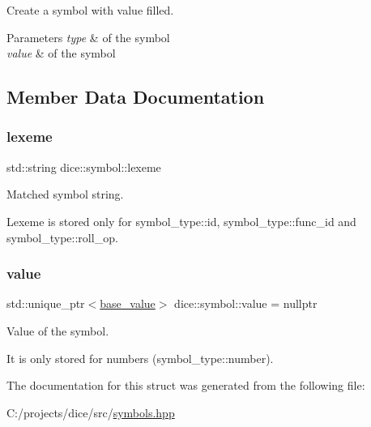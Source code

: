 Create a symbol with value filled. 


\begin{DoxyParams}{Parameters}
{\em type} & of the symbol \\
\hline
{\em value} & of the symbol \\
\hline
\end{DoxyParams}


\subsection{Member Data Documentation}
\mbox{\label{structdice_1_1symbol_abef11b61a11ced6140a6e1626bce0350}} 
\subsubsection{\texorpdfstring{lexeme}{lexeme}}
{\footnotesize\ttfamily std\+::string dice\+::symbol\+::lexeme}



Matched symbol string. 

Lexeme is stored only for symbol\+\_\+type\+::id, symbol\+\_\+type\+::func\+\_\+id and symbol\+\_\+type\+::roll\+\_\+op. \mbox{\label{structdice_1_1symbol_a9575fe2bdb23550a1cbd1cb0bb0d1c4b}} 
\subsubsection{\texorpdfstring{value}{value}}
{\footnotesize\ttfamily std\+::unique\+\_\+ptr$<$\mbox{\hyperlink{classdice_1_1base__value}{base\+\_\+value}}$>$ dice\+::symbol\+::value = nullptr}



Value of the symbol. 

It is only stored for numbers (symbol\+\_\+type\+::number). 

The documentation for this struct was generated from the following file\+:\begin{DoxyCompactItemize}
\item 
C\+:/projects/dice/src/\mbox{\hyperlink{symbols_8hpp}{symbols.\+hpp}}\end{DoxyCompactItemize}
